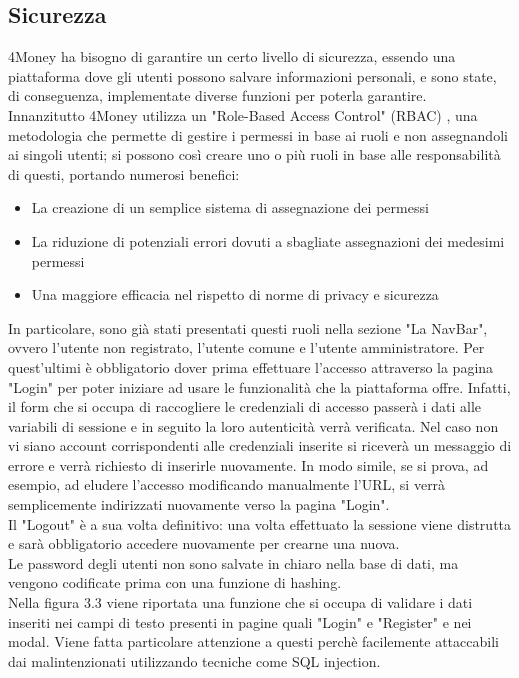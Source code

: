 \documentclass[binding=0.6cm, oneside, noexaminfo, italian]{sapthesis}
\begin{document}
\subsection{Sicurezza}
4Money ha bisogno di garantire un certo livello di sicurezza, essendo una piattaforma dove gli utenti possono salvare informazioni personali, e sono state, di conseguenza, implementate diverse funzioni per poterla garantire. \\
Innanzitutto 4Money utilizza un "Role-Based Access Control" (RBAC)  \cite{RBAC}, una metodologia che permette di gestire i permessi in base ai ruoli e non assegnandoli ai singoli utenti; si possono così creare uno o più ruoli in base alle responsabilità di questi, portando numerosi benefici:
\begin{itemize}
    \item La creazione di un semplice sistema di assegnazione dei permessi
    \item La riduzione di potenziali errori dovuti a sbagliate assegnazioni dei medesimi permessi
    \item Una maggiore efficacia nel rispetto di norme di privacy e sicurezza
\end{itemize}
In particolare, sono già stati presentati questi ruoli nella sezione "La NavBar", ovvero l'utente non registrato, l'utente comune e l'utente amministratore. Per quest'ultimi è obbligatorio dover prima effettuare l'accesso attraverso la pagina "Login" per poter iniziare ad usare le funzionalità che la piattaforma offre. Infatti, il form che si occupa di raccogliere le credenziali di accesso passerà i dati alle variabili di sessione e in seguito la loro autenticità verrà verificata. Nel caso non vi siano account corrispondenti alle credenziali inserite si riceverà un messaggio di errore e verrà richiesto di inserirle nuovamente. In modo simile, se si prova, ad esempio, ad eludere l'accesso modificando manualmente l'URL, si verrà semplicemente indirizzati nuovamente verso la pagina "Login". \\
Il "Logout" è a sua volta definitivo: una volta effettuato la sessione viene distrutta e sarà obbligatorio accedere nuovamente per crearne una nuova. \\
Le password degli utenti non sono salvate in chiaro nella base di dati, ma vengono codificate prima con una funzione di hashing. \\
Nella figura 3.3 viene riportata una funzione che si occupa di validare i dati inseriti nei campi di testo presenti in pagine quali "Login" e "Register" e nei modal. Viene fatta particolare attenzione a questi perchè facilemente attaccabili dai malintenzionati utilizzando tecniche come SQL injection.
\end{document}
